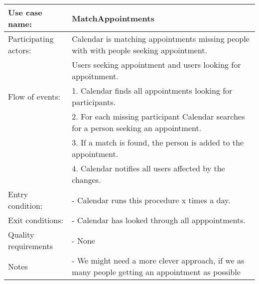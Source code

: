 {\tabulinesep=1.2mm
\begin{tabu}{ | p{3cm} | p{13cm} |}
    \hline
    Use case name: 			& 		MatchAppointments\\ \hline
    Participating actors:	& 		Calendar is matching appointments missing people with with people seeking appointment. \\
 							&		Users seeking appointment and users looking for appoitnment.\\ \hline
    Flow of events: 		& 		1. Calendar finds all appointments looking for participants. \\
							&		2. For each missing participant Calendar searches for a person seeking an appointment.\\
							&		3. If a match is found, the person is added to the appointment.\\
							&		4. Calendar notifies all users affected by the changes.\\\hline
    Entry condition: 		& 		- Calendar runs this procedure x times a day. \\ \hline
	Exit conditions: 		&		- Calendar has looked through all apppointments.\\\hline
	Quality requirements	&	 	- None \\\hline
	Notes					&	 	- We might need a more clever approach, if we as many people getting an appointment as possible \\\hline
\end{tabu}
}